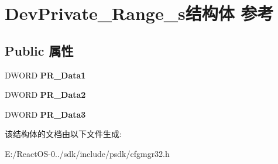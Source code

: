 \hypertarget{struct_dev_private___range__s}{}\section{Dev\+Private\+\_\+\+Range\+\_\+s结构体 参考}
\label{struct_dev_private___range__s}
\subsection*{Public 属性}
\begin{DoxyCompactItemize}
\item 
\mbox{\label{struct_dev_private___range__s_acf8ed8e2324f5c4c6ab1eab02e36fbb7}} 
D\+W\+O\+RD {\bfseries P\+R\+\_\+\+Data1}
\item 
\mbox{\label{struct_dev_private___range__s_a3f5c361c7dd659dbdade47d2321c5ba0}} 
D\+W\+O\+RD {\bfseries P\+R\+\_\+\+Data2}
\item 
\mbox{\label{struct_dev_private___range__s_a8cd9e046682c9019763a03d4c38f93b1}} 
D\+W\+O\+RD {\bfseries P\+R\+\_\+\+Data3}
\end{DoxyCompactItemize}


该结构体的文档由以下文件生成\+:\begin{DoxyCompactItemize}
\item 
E\+:/\+React\+O\+S-\/0../sdk/include/psdk/cfgmgr32.\+h\end{DoxyCompactItemize}
